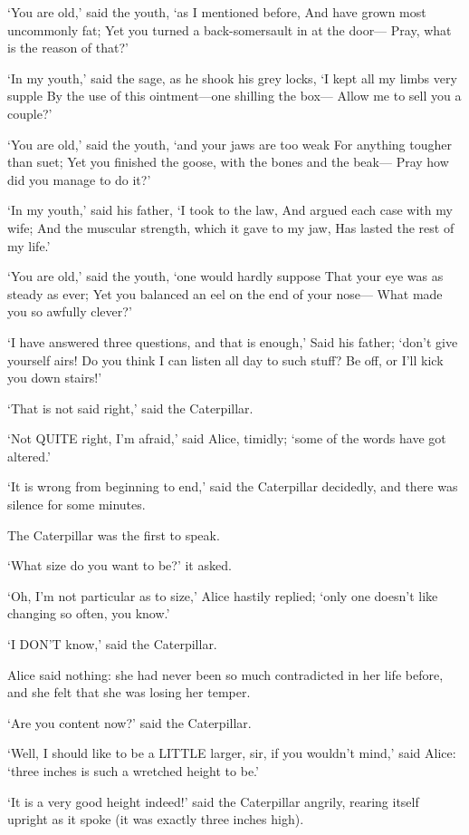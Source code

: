 \documentclass[12pt]{book}
\begin{document}
\begin{Parallel}[p]{}{}
{   ‘You are old,’ said the youth, ‘as I mentioned before,
    And have grown most uncommonly fat;
   Yet you turned a back-somersault in at the door—
    Pray, what is the reason of that?’

   ‘In my youth,’ said the sage, as he shook his grey locks,
    ‘I kept all my limbs very supple
   By the use of this ointment—one shilling the box—
    Allow me to sell you a couple?’

   ‘You are old,’ said the youth, ‘and your jaws are too weak
    For anything tougher than suet;
   Yet you finished the goose, with the bones and the beak—
    Pray how did you manage to do it?’

   ‘In my youth,’ said his father, ‘I took to the law,
    And argued each case with my wife;
   And the muscular strength, which it gave to my jaw,
    Has lasted the rest of my life.’

   ‘You are old,’ said the youth, ‘one would hardly suppose
    That your eye was as steady as ever;
   Yet you balanced an eel on the end of your nose—
    What made you so awfully clever?’

   ‘I have answered three questions, and that is enough,’
    Said his father; ‘don’t give yourself airs!
   Do you think I can listen all day to such stuff?
    Be off, or I’ll kick you down stairs!’


‘That is not said right,’ said the Caterpillar.

‘Not QUITE right, I’m afraid,’ said Alice, timidly; ‘some of the words have got altered.’

‘It is wrong from beginning to end,’ said the Caterpillar decidedly, and there was silence for some minutes.

The Caterpillar was the first to speak.

‘What size do you want to be?’ it asked.

‘Oh, I’m not particular as to size,’ Alice hastily replied; ‘only one doesn’t like changing so often, you know.’

‘I DON’T know,’ said the Caterpillar.

Alice said nothing: she had never been so much contradicted in her life before, and she felt that she was losing her temper.

‘Are you content now?’ said the Caterpillar.

‘Well, I should like to be a LITTLE larger, sir, if you wouldn’t mind,’ said Alice: ‘three inches is such a wretched height to be.’

‘It is a very good height indeed!’ said the Caterpillar angrily, rearing itself upright as it spoke (it was exactly three inches high).

}
\end{Parallel}
\end{document}

